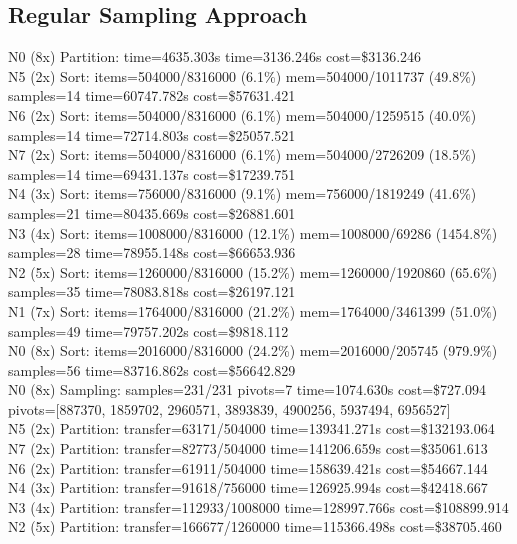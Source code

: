 \documentclass[]{interact}
\theoremstyle{plain}
\theoremstyle{definition}
\theoremstyle{remark}
\begin{document}
\subsection{Regular Sampling Approach}
N0 (8x) Partition: time=4635.303\textmu s time=3136.246\textmu s cost=\$3136.246\\
N5 (2x) Sort: items=504000/8316000 (6.1\%) mem=504000/1011737 (49.8\%) samples=14 time=60747.782\textmu s cost=\$57631.421\\
N6 (2x) Sort: items=504000/8316000 (6.1\%) mem=504000/1259515 (40.0\%) samples=14 time=72714.803\textmu s cost=\$25057.521\\
N7 (2x) Sort: items=504000/8316000 (6.1\%) mem=504000/2726209 (18.5\%) samples=14 time=69431.137\textmu s cost=\$17239.751\\
N4 (3x) Sort: items=756000/8316000 (9.1\%) mem=756000/1819249 (41.6\%) samples=21 time=80435.669\textmu s cost=\$26881.601\\
N3 (4x) Sort: items=1008000/8316000 (12.1\%) mem=1008000/69286 (1454.8\%) samples=28 time=78955.148\textmu s cost=\$66653.936\\
N2 (5x) Sort: items=1260000/8316000 (15.2\%) mem=1260000/1920860 (65.6\%) samples=35 time=78083.818\textmu s cost=\$26197.121\\
N1 (7x) Sort: items=1764000/8316000 (21.2\%) mem=1764000/3461399 (51.0\%) samples=49 time=79757.202\textmu s cost=\$9818.112\\
N0 (8x) Sort: items=2016000/8316000 (24.2\%) mem=2016000/205745 (979.9\%) samples=56 time=83716.862\textmu s cost=\$56642.829\\
N0 (8x) Sampling: samples=231/231 pivots=7 time=1074.630\textmu s cost=\$727.094 pivots=[887370, 1859702, 2960571, 3893839, 4900256, 5937494, 6956527]\\
N5 (2x) Partition: transfer=63171/504000 time=139341.271\textmu s cost=\$132193.064\\
N7 (2x) Partition: transfer=82773/504000 time=141206.659\textmu s cost=\$35061.613\\
N6 (2x) Partition: transfer=61911/504000 time=158639.421\textmu s cost=\$54667.144\\
N4 (3x) Partition: transfer=91618/756000 time=126925.994\textmu s cost=\$42418.667\\
N3 (4x) Partition: transfer=112933/1008000 time=128997.766\textmu s cost=\$108899.914\\
N2 (5x) Partition: transfer=166677/1260000 time=115366.498\textmu s cost=\$38705.460\\
\end{document}

